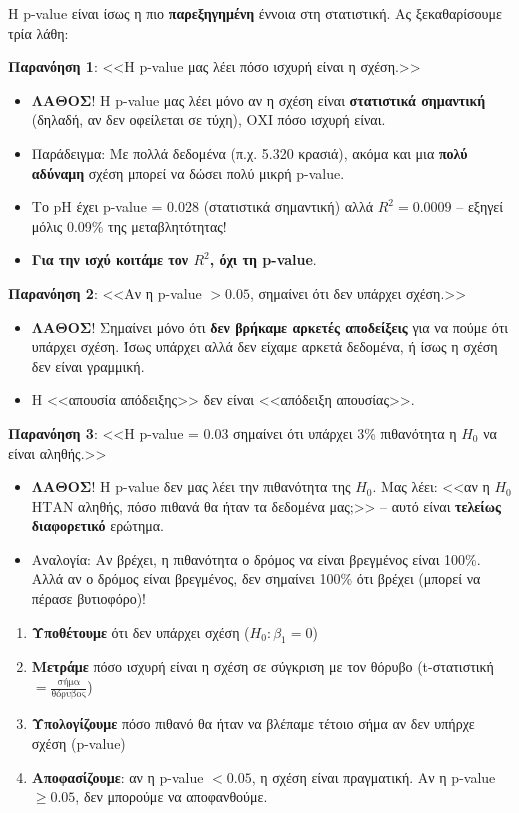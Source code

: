 \documentclass[12pt,a4paper]{article}
\begin{document}
\begin{warningbox}[title={Τρεις συχνές παρανοήσεις για τη p-value}]
Η p-value είναι ίσως η πιο \textbf{παρεξηγημένη} έννοια στη στατιστική. Ας ξεκαθαρίσουμε τρία λάθη:

\textbf{Παρανόηση 1}: <<Η p-value μας λέει πόσο ισχυρή είναι η σχέση.>>
\begin{itemize}
    \item \textbf{ΛΑΘΟΣ}! Η p-value μας λέει μόνο αν η σχέση είναι \textbf{στατιστικά σημαντική} (δηλαδή, αν δεν οφείλεται σε τύχη), ΟΧΙ πόσο ισχυρή είναι.
    \item Παράδειγμα: Με πολλά δεδομένα (π.χ. 5.320 κρασιά), ακόμα και μια \textbf{πολύ αδύναμη} σχέση μπορεί να δώσει πολύ μικρή p-value.
    \item Το pH έχει p-value = 0.028 (στατιστικά σημαντική) αλλά $R^2 = 0.0009$ -- εξηγεί μόλις 0.09\% της μεταβλητότητας!
    \item \textbf{Για την ισχύ κοιτάμε τον $R^2$, όχι τη p-value}.
\end{itemize}

\textbf{Παρανόηση 2}: <<Αν η p-value $> 0.05$, σημαίνει ότι δεν υπάρχει σχέση.>>
\begin{itemize}
    \item \textbf{ΛΑΘΟΣ}! Σημαίνει μόνο ότι \textbf{δεν βρήκαμε αρκετές αποδείξεις} για να πούμε ότι υπάρχει σχέση. Ίσως υπάρχει αλλά δεν είχαμε αρκετά δεδομένα, ή ίσως η σχέση δεν είναι γραμμική.
    \item Η <<απουσία απόδειξης>> δεν είναι <<απόδειξη απουσίας>>.
\end{itemize}

\textbf{Παρανόηση 3}: <<Η p-value = 0.03 σημαίνει ότι υπάρχει 3\% πιθανότητα η $H_0$ να είναι αληθής.>>
\begin{itemize}
    \item \textbf{ΛΑΘΟΣ}! Η p-value δεν μας λέει την πιθανότητα της $H_0$. Μας λέει: <<αν η $H_0$ ΗΤΑΝ αληθής, πόσο πιθανά θα ήταν τα δεδομένα μας;>> -- αυτό είναι \textbf{τελείως διαφορετικό} ερώτημα.
    \item Αναλογία: Αν βρέχει, η πιθανότητα ο δρόμος να είναι βρεγμένος είναι 100\%. Αλλά αν ο δρόμος είναι βρεγμένος, δεν σημαίνει 100\% ότι βρέχει (μπορεί να πέρασε βυτιοφόρο)!
\end{itemize}
\end{warningbox}

\begin{importantbox}
\begin{enumerate}
    \item \textbf{Υποθέτουμε} ότι δεν υπάρχει σχέση ($H_0: \beta_1 = 0$)
    \item \textbf{Μετράμε} πόσο ισχυρή είναι η σχέση σε σύγκριση με τον θόρυβο (t-στατιστική $= \frac{\text{σήμα}}{\text{θόρυβος}}$)
    \item \textbf{Υπολογίζουμε} πόσο πιθανό θα ήταν να βλέπαμε τέτοιο σήμα αν δεν υπήρχε σχέση (p-value)
    \item \textbf{Αποφασίζουμε}: αν η p-value $< 0.05$, η σχέση είναι πραγματική. Αν η p-value $\geq 0.05$, δεν μπορούμε να αποφανθούμε.
\end{enumerate}
\end{importantbox}
\end{document}
